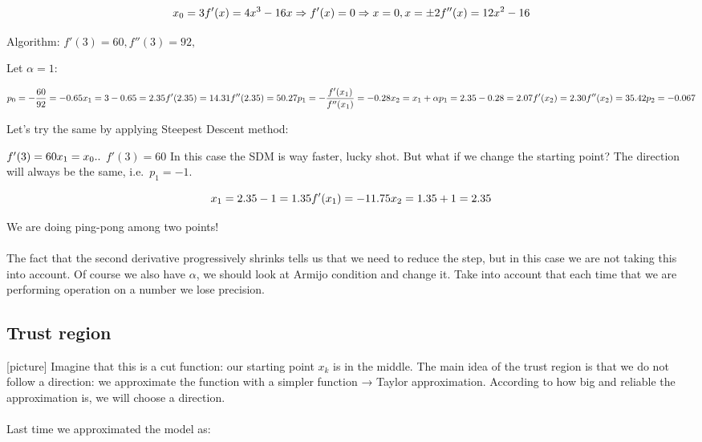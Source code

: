 $$
x_0=3 \\ f'(x) = 4x^3-16x \Rightarrow f'(x)=0 \Rightarrow  x=0, x=\pm 2\\ f''(x)=12x^2-16
$$

Algorithm: $f'(3)=60, f''(3)=92,$

Let $\alpha=1$:

$$
p_0= -\frac{60}{92}=-0.65 \\ x_1=3-0.65=2.35 \\ f'(2.35) = 14.31\\ f''(2.35) = 50.27 \\ p_1=-\frac{f'(x_1)}{f''(x_1)} = -0.28\\ x_2=x_1+\alpha p_1 = 2.35-0.28=2.07 \\ f'(x_2) = 2.30 \\ f''(x_2)=35.42\\ p_2 = -0.067
$$

Let's try the same by applying Steepest Descent method:

$f'(3)=60 \\ x_1 = x_0..$
$f'(3)=60$
\noindent
In this case the SDM is way faster, lucky shot. But what if we change
the starting point? The direction will always be the same,
i.e.~$p_1 = -1$.

$$
x_1=2.35-1=1.35\\f'(x_1)=-11.75\\x_2=1.35+1 = 2.35 
$$

We are doing ping-pong among two points!
\\
\\
\noindent
The fact that the second derivative progressively shrinks tells us that
we need to reduce the step, but in this case we are not taking this into
account. Of course we also have $\alpha$, we should look at Armijo
condition and change it.
Take into account that each time that we are performing operation on a
number we lose precision.


\subsection{Trust region}

{[}picture{]}
\noindent
Imagine that this is a cut function: our starting point $x_k$ is in the
middle. The main idea of the trust region is that we do not follow a
direction: we approximate the function with a simpler function → Taylor
approximation. According to how big and reliable the approximation is,
we will choose a direction.
\\
\\
\noindent
Last time we approximated the model as:


